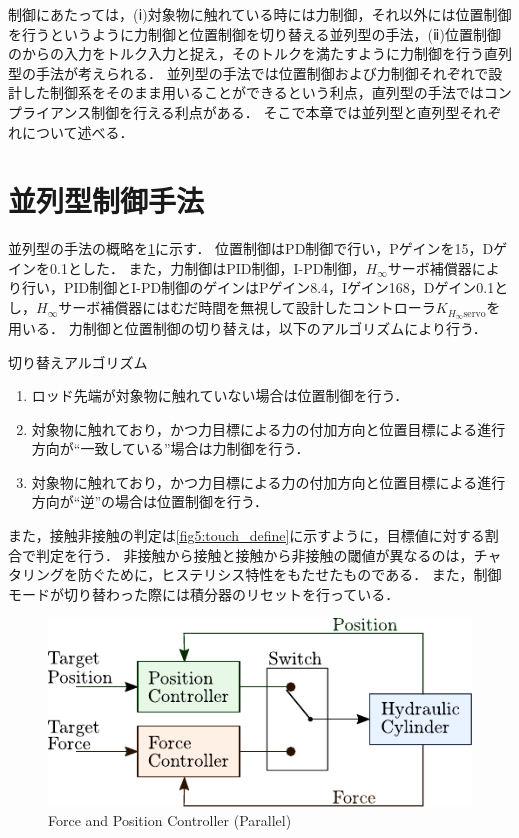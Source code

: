 制御にあたっては，(ⅰ)対象物に触れている時には力制御，それ以外には位置制御を行うというように力制御と位置制御を切り替える並列型の手法，(ⅱ)位置制御のからの入力をトルク入力と捉え，そのトルクを満たすように力制御を行う直列型の手法が考えられる．
並列型の手法では位置制御および力制御それぞれで設計した制御系をそのまま用いることができるという利点，直列型の手法ではコンプライアンス制御を行える利点がある．
そこで本章では並列型と直列型それぞれについて述べる．

\section{並列型制御手法}
\label{sec:並列型制御手法}
並列型の手法の概略を\figname\ref{fig5:pararell_torqueandposition}に示す．
位置制御はPD制御で行い，Pゲインを15，Dゲインを0.1とした．
また，力制御はPID制御，I-PD制御，$H_\infty$サーボ補償器により行い，PID制御とI-PD制御のゲインはPゲイン8.4，Iゲイン168，Dゲイン0.1とし，$H_\infty$サーボ補償器にはむだ時間を無視して設計したコントローラ$K_{H_\infty\mathrm{servo}}$を用いる．
力制御と位置制御の切り替えは，以下のアルゴリズムにより行う．
\begin{itembox}[l]{切り替えアルゴリズム}
    \begin{enumerate}
        \item ロッド先端が対象物に触れていない場合は位置制御を行う．
        \item 対象物に触れており，かつ力目標による力の付加方向と位置目標による進行方向が``一致している''場合は力制御を行う．
        \item 対象物に触れており，かつ力目標による力の付加方向と位置目標による進行方向が``逆''の場合は位置制御を行う．
    \end{enumerate}
\end{itembox}

また，接触非接触の判定は\figname\ref{fig5:touch_define}に示すように，目標値に対する割合で判定を行う．
非接触から接触と接触から非接触の閾値が異なるのは，チャタリングを防ぐために，ヒステリシス特性をもたせたものである．
また，制御モードが切り替わった際には積分器のリセットを行っている．

\begin{figure}[t]
    \centering
        \includegraphics[keepaspectratio, scale=1.0]{contents/IntegrationControl/figure/pararell_torqueandposition.pdf}
        \caption{Force and Position Controller (Parallel)}
        \label{fig5:pararell_torqueandposition}
\end{figure}

